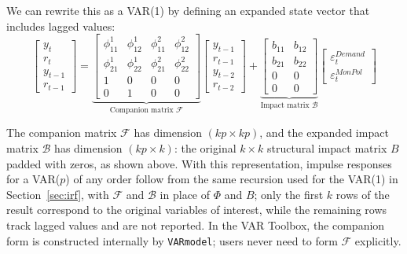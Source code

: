 \documentclass[12pt]{article}
\newcommand{\mci}[1]{\colorbox{script!80}{\texttt{#1}}}
\begin{document}
\begin{notebox}[label=box:companion]
We can rewrite this as a VAR(1) by defining an expanded state vector that includes lagged values:
\begin{equation*}
\begin{bmatrix}
y_t \\
r_t \\
y_{t-1} \\
r_{t-1}
\end{bmatrix}
=
\underbrace{
\begin{bmatrix}
\phi_{11}^1 & \phi_{12}^1 & \phi_{11}^2 & \phi_{12}^2 \\
\phi_{21}^1 & \phi_{22}^1 & \phi_{21}^2 & \phi_{22}^2 \\
1 & 0 & 0 & 0 \\
0 & 1 & 0 & 0
\end{bmatrix}}_{\text{Companion matrix } \mathcal{F}}
\begin{bmatrix}
y_{t-1} \\
r_{t-1} \\
y_{t-2} \\
r_{t-2}
\end{bmatrix}
+
\underbrace{
\begin{bmatrix}
b_{11} & b_{12} \\
b_{21} & b_{22} \\
0 & 0 \\
0 & 0
\end{bmatrix}}_{\text{Impact matrix } \mathcal{B}}
\begin{bmatrix}
\varepsilon_t^{Demand} \\
\varepsilon_t^{MonPol}
\end{bmatrix}
\end{equation*}

The companion matrix $\mathcal{F}$ has dimension $(kp \times kp)$, and the expanded impact matrix $\mathcal{B}$ has dimension $(kp \times k)$: the original $k \times k$ structural impact matrix $B$ padded with zeros, as shown above. With this representation, impulse responses for a VAR($p$) of any order follow from the same recursion used for the VAR(1) in Section~\ref{sec:irf}, with $\mathcal{F}$ and $\mathcal{B}$ in place of $\Phi$ and $B$; only the first $k$ rows of the result correspond to the original variables of interest, while the remaining rows track lagged values and are not reported. In the VAR Toolbox, the companion form is constructed internally by \mci{VARmodel}; users never need to form $\mathcal{F}$ explicitly.
\end{notebox}
\end{document}
